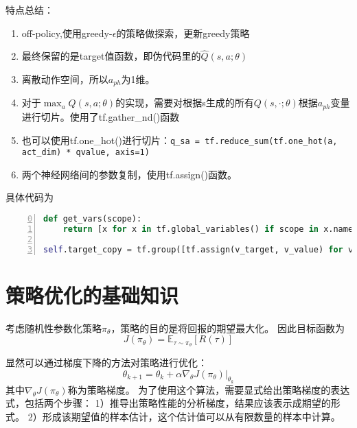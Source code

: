 特点总结：
\begin{enumerate}
    \item off-policy,使用greedy-$\epsilon$的策略做探索，更新greedy策略
    \item 最终保留的是target值函数，即伪代码里的$\hat{Q}(s,a;\theta)$
    \item 离散动作空间，所以$a_{ph}$为1维。
    \item 对于$\max_a Q(s,a;\theta)$的实现，需要对根据s生成的所有$Q(s,\cdot;\theta)$根据$a_{ph}$变量进行切片。使用了tf.gather\_nd()函数
    \item 也可以使用tf.one_hot()进行切片：\texttt{q_sa = tf.reduce_sum(tf.one_hot(a, act_dim) * qvalue, axis=1)}
    \item 两个神经网络间的参数复制，使用tf.assign()函数。
\end{enumerate}

具体代码为
\begin{lstlisting}[language=python,numbers=left,firstnumber = 0,numberstyle=\tiny,breaklines = true,keywordstyle=\color{blue!70},commentstyle=\color{red!50!green!50!blue!50},frame=shadowbox, rulesepcolor=\color{red!20!green!20!blue!20}]
def get_vars(scope):
    return [x for x in tf.global_variables() if scope in x.name]}

self.target_copy = tf.group([tf.assign(v_target, v_value) for v_value, v_target in zip(get_vars('value'), get_vars('target'))])
\end{lstlisting}






\section{策略优化的基础知识}
考虑随机性参数化策略$\pi_\theta$，策略的目的是将回报的期望最大化。
因此目标函数为
\begin{equation*}
    J(\pi_\theta) = \mathbb{E}_{\tau\sim\pi_\theta}[R(\tau)]
\end{equation*}

显然可以通过梯度下降的方法对策略进行优化：
\begin{equation*}
    \theta_{k+1} = \theta_k + \alpha \nabla_\theta J(\pi_\theta)|_{\theta_k}
\end{equation*}
其中$\nabla_\theta J(\pi_\theta)$称为策略梯度。
为了使用这个算法，需要显式给出策略梯度的表达式，包括两个步骤：
1）推导出策略性能的分析梯度，结果应该表示成期望的形式。
2）形成该期望值的样本估计，这个估计值可以从有限数量的样本中计算。

